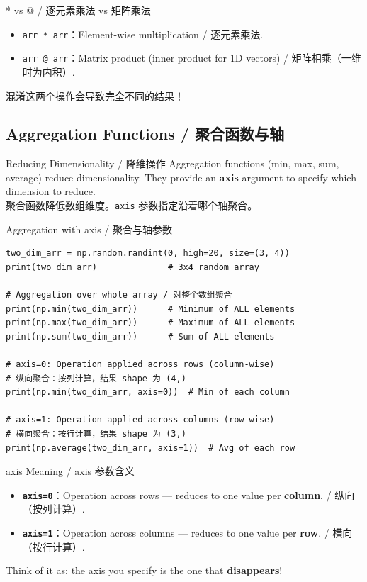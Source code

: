 \documentclass[11pt,a4paper]{report}
\let\oldtexttt\texttt
\renewcommand{\texttt}[1]{\textcolor{mainblue}{\oldtexttt{#1}}}
\begin{document}
\begin{warning}{* vs @ / 逐元素乘法 vs 矩阵乘法}
    \begin{itemize}[itemsep=0.3em]
        \item \texttt{arr * arr}：Element-wise multiplication / 逐元素乘法.
        \item \texttt{arr @ arr}：Matrix product (inner product for 1D vectors) / 矩阵相乘（一维时为内积）.
    \end{itemize}
    混淆这两个操作会导致完全不同的结果！
\end{warning}

\subsection{Aggregation Functions / 聚合函数与轴}

\begin{concept}{Reducing Dimensionality / 降维操作}
    Aggregation functions (min, max, sum, average) reduce dimensionality. They provide an \textbf{axis} argument to specify which dimension to reduce. \\
    聚合函数降低数组维度。\texttt{axis} 参数指定沿着哪个轴聚合。
\end{concept}

\begin{examplebox}{Aggregation with axis / 聚合与轴参数}
\begin{lstlisting}
two_dim_arr = np.random.randint(0, high=20, size=(3, 4))
print(two_dim_arr)              # 3x4 random array

# Aggregation over whole array / 对整个数组聚合
print(np.min(two_dim_arr))      # Minimum of ALL elements
print(np.max(two_dim_arr))      # Maximum of ALL elements
print(np.sum(two_dim_arr))      # Sum of ALL elements

# axis=0: Operation applied across rows (column-wise)
# 纵向聚合：按列计算，结果 shape 为 (4,)
print(np.min(two_dim_arr, axis=0))  # Min of each column

# axis=1: Operation applied across columns (row-wise)
# 横向聚合：按行计算，结果 shape 为 (3,)
print(np.average(two_dim_arr, axis=1))  # Avg of each row
\end{lstlisting}
\end{examplebox}

\begin{warning}{axis Meaning / axis 参数含义}
    \begin{itemize}
        \item \textbf{\texttt{axis=0}}：Operation across rows — reduces to one value per \textbf{column}. / 纵向（按列计算）.
        \item \textbf{\texttt{axis=1}}：Operation across columns — reduces to one value per \textbf{row}. / 横向（按行计算）.
    \end{itemize}
    Think of it as: the axis you specify is the one that \textbf{disappears}!
\end{warning}
\end{document}
